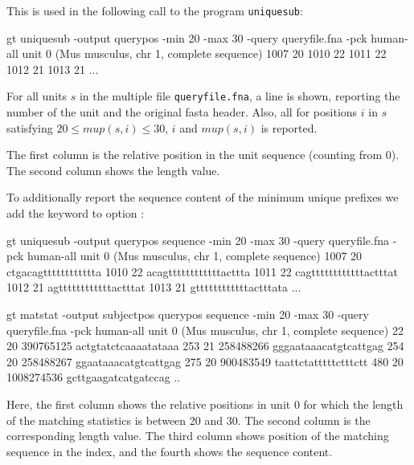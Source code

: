 \documentclass[12pt]{article}
\newcommand{\Program}[0]{\texttt{uniquesub}\xspace}
\newcommand{\Mup}[1]{\mathit{mup(s,#1)}}
\newcommand{\Program}[0]{\texttt{matstat}\xspace}
\begin{document}
This is used in the following call to the program \Program:

\begin{AboutUniquesub}
\begin{Output}
gt uniquesub -output querypos -min 20 -max 30 -query queryfile.fna 
             -pck human-all
unit 0 (Mus musculus, chr 1, complete sequence)
1007 20
1010 22
1011 22
1012 21
1013 21
...
\end{Output}

For all units \(s\) in the multiple \Fasta file \texttt{queryfile.fna},
a line is shown, reporting the number of the unit and the original fasta
header. Also, all for positions \(i\) in \(s\) satisfying 
\(20\leq \Mup{i}\leq 30\), \(i\) and \(\Mup{i}\) is reported.

The first column is the relative position in the unit sequence (counting
from 0). The second column shows the length value.

To additionally report the sequence content of the
minimum unique prefixes we add the keyword  to option
:

\begin{Output}
gt uniquesub -output querypos sequence -min 20 -max 30 
             -query queryfile.fna -pck human-all
unit 0 (Mus musculus, chr 1, complete sequence)
1007 20 ctgacagtttttttttttta
1010 22 acagttttttttttttacttta
1011 22 cagttttttttttttactttat
1012 21 agttttttttttttactttat
1013 21 gttttttttttttactttata
...
\end{Output}
\end{AboutUniquesub}

\begin{AboutMatstat}
\begin{Output}
gt matstat -output subjectpos querypos sequence -min 20 -max 30 
           -query queryfile.fna -pck human-all
unit 0 (Mus musculus, chr 1, complete sequence)
22 20 390765125 actgtatctcaaaatataaa
253 21 258488266 gggaataaacatgtcattgag
254 20 258488267 ggaataaacatgtcattgag
275 20 900483549 taattctatttttctttctt
480 20 1008274536 gcttgaagatcatgatccag
..
\end{Output}
Here, the first column shows the relative positions in unit 0 for which the
length of the matching statistics is between 20 and 30. The second column is
the corresponding length value. The third column shows position of the
matching sequence in the index, and the fourth shows the sequence content.
\end{AboutMatstat}
\end{document}
